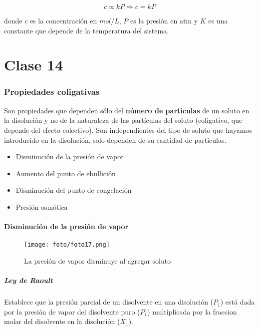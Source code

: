 \documentclass[]{article}
\begin{document}
\begin{equation}
c \varpropto kP  \Rightarrow c=kP
\end{equation}

donde $c$ es la concentración en $mol/L$, $P$ es la presión en atm y $K$ es una constante que depende de la temperatura del sistema. 



\part{Clase 14}



\section{Propiedades coligativas}
Son propiedades que dependen sólo del \textbf{número de particulas} de un soluto en la disolución y no de la naturaleza de las partículas del soluto (coligativo, que depende del efecto colectivo). Son independientes del tipo de soluto que hayamos introducido en la disolución, solo dependen de su cantidad de particulas.

\begin{itemize}
	\item Disminución de la presión de vapor
	\item Aumento del punto de ebullición
	\item Disminución del punto de congelación
	\item Presión osmótica
\end{itemize}



\subsection{Disminución de la presión de vapor}

\begin{figure}[H]
\center
\texttt{[image: foto/foto17.png]}
\caption{La presión de vapor disminuye al agregar soluto}		
\end{figure}

\subsubsection{Ley de Raoult}
Establece que la presión parcial de un disolvente en una disolución ($P_{1}$) está dada por la presión de vapor del disolvente puro ($P_{1}^{\circ}$) multiplicada por la fraccion molar del disolvente en la disolución ($X_{1}$).
\end{document}

